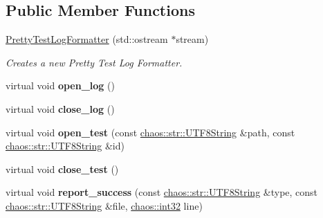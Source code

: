 \subsection*{Public Member Functions}
\begin{DoxyCompactItemize}
\item 
\hypertarget{classchaos_1_1test_1_1log__formatter_1_1_pretty_test_log_formatter_ad537150be7fb4514fb9b47aba18ea73f}{}\hyperlink{classchaos_1_1test_1_1log__formatter_1_1_pretty_test_log_formatter_ad537150be7fb4514fb9b47aba18ea73f}{Pretty\+Test\+Log\+Formatter} (std\+::ostream $\ast$stream)\label{classchaos_1_1test_1_1log__formatter_1_1_pretty_test_log_formatter_ad537150be7fb4514fb9b47aba18ea73f}

\begin{DoxyCompactList}\small\item\em Creates a new Pretty Test Log Formatter. \end{DoxyCompactList}\item 
\hypertarget{classchaos_1_1test_1_1log__formatter_1_1_pretty_test_log_formatter_acfc156f1c2b4c0b688573f648c6b7349}{}virtual void {\bfseries open\+\_\+log} ()\label{classchaos_1_1test_1_1log__formatter_1_1_pretty_test_log_formatter_acfc156f1c2b4c0b688573f648c6b7349}

\item 
\hypertarget{classchaos_1_1test_1_1log__formatter_1_1_pretty_test_log_formatter_a55167e42a2e956fc520ab7671945bf36}{}virtual void {\bfseries close\+\_\+log} ()\label{classchaos_1_1test_1_1log__formatter_1_1_pretty_test_log_formatter_a55167e42a2e956fc520ab7671945bf36}

\item 
\hypertarget{classchaos_1_1test_1_1log__formatter_1_1_pretty_test_log_formatter_ae77aea3084d292464322207573b18a53}{}virtual void {\bfseries open\+\_\+test} (const \hyperlink{classchaos_1_1str_1_1_u_t_f8_string}{chaos\+::str\+::\+U\+T\+F8\+String} \&path, const \hyperlink{classchaos_1_1str_1_1_u_t_f8_string}{chaos\+::str\+::\+U\+T\+F8\+String} \&id)\label{classchaos_1_1test_1_1log__formatter_1_1_pretty_test_log_formatter_ae77aea3084d292464322207573b18a53}

\item 
\hypertarget{classchaos_1_1test_1_1log__formatter_1_1_pretty_test_log_formatter_a02d6208a064405bcd183661755eb2289}{}virtual void {\bfseries close\+\_\+test} ()\label{classchaos_1_1test_1_1log__formatter_1_1_pretty_test_log_formatter_a02d6208a064405bcd183661755eb2289}

\item 
\hypertarget{classchaos_1_1test_1_1log__formatter_1_1_pretty_test_log_formatter_afe82e87c8343d355387bf2937463c3f1}{}virtual void {\bfseries report\+\_\+success} (const \hyperlink{classchaos_1_1str_1_1_u_t_f8_string}{chaos\+::str\+::\+U\+T\+F8\+String} \&type, const \hyperlink{classchaos_1_1str_1_1_u_t_f8_string}{chaos\+::str\+::\+U\+T\+F8\+String} \&file, \hyperlink{namespacechaos_ad1de7efb430365afd2c9446a0f522a90}{chaos\+::int32} line)\label{classchaos_1_1test_1_1log__formatter_1_1_pretty_test_log_formatter_afe82e87c8343d355387bf2937463c3f1}


\end{DoxyCompactItemize}
